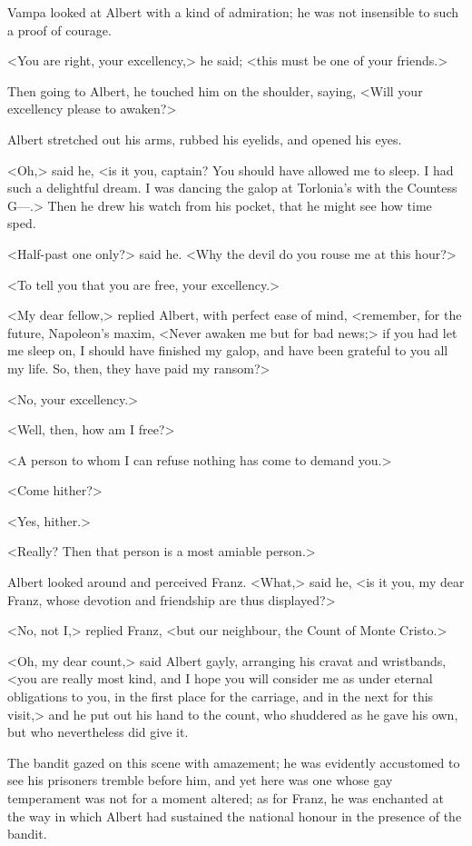  Vampa looked at Albert with a kind of admiration; he was not insensible to such a proof of courage. 

 <You are right, your excellency,> he said; <this must be one of your friends.> 

 Then going to Albert, he touched him on the shoulder, saying, <Will your excellency please to awaken?> 

 Albert stretched out his arms, rubbed his eyelids, and opened his eyes. 

 <Oh,> said he, <is it you, captain? You should have allowed me to sleep. I had such a delightful dream. I was dancing the galop at Torlonia's with the Countess G—.> Then he drew his watch from his pocket, that he might see how time sped. 

 <Half-past one only?> said he. <Why the devil do you rouse me at this hour?> 

 <To tell you that you are free, your excellency.> 

 <My dear fellow,> replied Albert, with perfect ease of mind, <remember, for the future, Napoleon's maxim, <Never awaken me but for bad news;> if you had let me sleep on, I should have finished my galop, and have been grateful to you all my life. So, then, they have paid my ransom?> 

 <No, your excellency.> 

 <Well, then, how am I free?> 

 <A person to whom I can refuse nothing has come to demand you.> 

 <Come hither?> 

 <Yes, hither.> 

 <Really? Then that person is a most amiable person.> 

 Albert looked around and perceived Franz. <What,> said he, <is it you, my dear Franz, whose devotion and friendship are thus displayed?> 

 <No, not I,> replied Franz, <but our neighbour, the Count of Monte Cristo.> 

 <Oh, my dear count,> said Albert gayly, arranging his cravat and wristbands, <you are really most kind, and I hope you will consider me as under eternal obligations to you, in the first place for the carriage, and in the next for this visit,> and he put out his hand to the count, who shuddered as he gave his own, but who nevertheless did give it. 

 The bandit gazed on this scene with amazement; he was evidently accustomed to see his prisoners tremble before him, and yet here was one whose gay temperament was not for a moment altered; as for Franz, he was enchanted at the way in which Albert had sustained the national honour in the presence of the bandit. 

